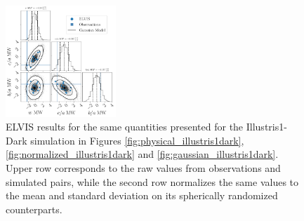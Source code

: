 \documentclass[a4paper,fleqn,usenatbib]{mnras}
\begin{document}
\begin{figure}
\includegraphics[width=0.37\textwidth]{gaussian_model_elvis_MW_n_11.pdf}
\caption{ELVIS results for the same quantities presented for the Illustris1-Dark
  simulation in Figures  
\ref{fig:physical_illustris1dark}, \ref{fig:normalized_illustris1dark}
and \ref{fig:gaussian_illustris1dark}.
Upper row corresponds to the raw values from observations and
simulated pairs, while the second row normalizes the same values to
the mean and standard deviation on its spherically randomized
counterparts. 
\label{fig:all_plots_elvis}}
\end{figure}
\end{document}
